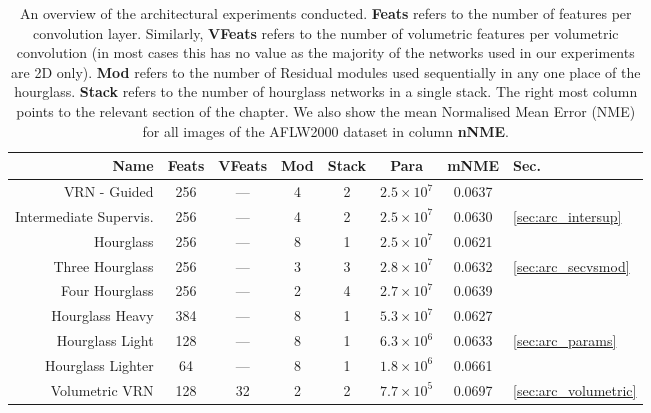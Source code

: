 \begin{table}
  \caption[Overview of architectural experiments]{An overview of the
    architectural experiments conducted. \textbf{Feats} refers to the
    number of features per convolution layer. Similarly,
    \textbf{VFeats} refers to the number of volumetric features per
    volumetric convolution (in most cases this has no value as the
    majority of the networks used in our experiments are 2D
    only). \textbf{Mod} refers to the number of Residual modules used
    sequentially in any one place of the hourglass. \textbf{Stack}
    refers to the number of hourglass networks in a single stack. The
    right most column points to the relevant section of the
    chapter. We also show the mean Normalised Mean Error (NME) for all
    images of the AFLW2000 dataset in column \textbf{nNME}.}
  \label{tab:arcexpoverview}
  \centering
  \small
  \begin{tabular}{|r|| c|c|c|c || c || c|l|}
    \hline
    \textbf{Name} & \textbf{Feats} & \textbf{VFeats} & \textbf{Mod} & \textbf{Stack} &  \textbf{Para} & \textbf{mNME} & \textbf{Sec.} \\
    \hline\hline
    VRN - Guided             & 256    & ---     & 4        & 2  & $2.5\times 10^7$    & 0.0637 &   \\
    \hline
    Intermediate Supervis.   & 256    & ---     & 4        & 2  & $2.5\times 10^7$    & 0.0630 & \ref{sec:arc_intersup}  \\
    \hline
    Hourglass                & 256    & ---     & 8        & 1  & $2.5\times 10^7$    & 0.0621 &   \\
    Three Hourglass          & 256    & ---     & 3        & 3  & $2.8\times 10^7$    & 0.0632 & \ref{sec:arc_secvsmod}  \\
    Four Hourglass           & 256    & ---     & 2        & 4  & $2.7\times 10^7$    & 0.0639 &   \\
    \hline
    Hourglass Heavy          & 384    & ---     & 8        & 1  & $5.3\times 10^7$    & 0.0627 &   \\
    Hourglass Light          & 128    & ---     & 8        & 1  & $6.3\times 10^6$    & 0.0633 & \ref{sec:arc_params}  \\
    Hourglass Lighter        & 64     & ---     & 8        & 1  & $1.8\times 10^6$    & 0.0661 &   \\
    \hline
    Volumetric VRN           & 128    & 32      & 2        & 2  & $7.7\times 10^5$    & 0.0697 & \ref{sec:arc_volumetric} \\
    \hline
  \end{tabular}
\end{table}

